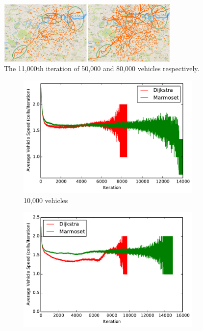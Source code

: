 \documentclass[ %
                    author={Alexander Hill},
                supervisor={Dr. Benjamin Sach},
                    degree={MEng},
                     title={MARMOSET},
                  subtitle={Multi-Agent Route Management using Online Simulation for Efficient Transportation},
                      type={research},
                      year={2016} ]{dissertation}
\begin{document}
\begin{figure}[p]
    \centering
    \includegraphics[width=0.8\textwidth]{i11k-sdv-comparison}
    \caption{The 11,000th iteration of 50,000 and 80,000 vehicles respectively.}\label{fig:i11k-congestion}
\end{figure}

\begin{figure}[p]
    \centering
    \begin{subfigure}[b]{0.3\textwidth}
        \centering
        \includegraphics[width=\textwidth]{sdv-dij-comp-10k}
        \caption{10,000 vehicles}
    \end{subfigure}
    \begin{subfigure}[b]{0.3\textwidth}
        \centering
        \includegraphics[width=\textwidth]{sdv-dij-comp-20k}

\end{subfigure}
\end{figure}
\end{document}
